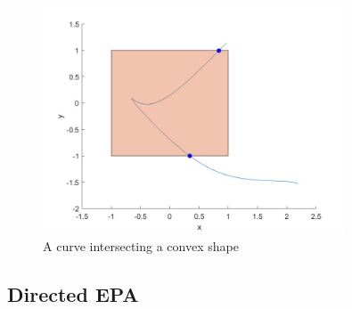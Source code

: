 \begin{figure}
\centering
\includegraphics[width=0.8\textwidth]{Images/curveintersectingshapes.jpg}
\caption{A curve intersecting a convex shape}
\label{fig:curveitersectingshapes}
\end{figure}

\subsection{Directed EPA}
\label{sec:epaalg}


